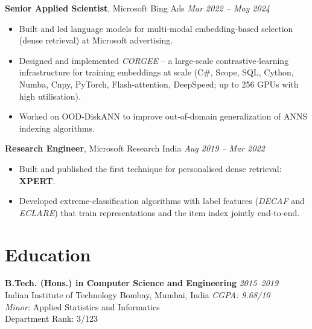 \documentclass[11pt,a4paper,sans]{moderncv}        %
\begin{document}
\textbf{Senior Applied Scientist}, Microsoft Bing Ads \hfill \textit{Mar 2022 -- May 2024}
\begin{itemize}
  \item Built and led language models for multi‑modal embedding‑based selection (dense retrieval) at Microsoft advertising.
  \item Designed and implemented \emph{CORGEE} -- a large‑scale contrastive‑learning infrastructure for training embeddings at scale (C\#, Scope, SQL, Cython, Numba, Cnpy, PyTorch, Flash‑attention, DeepSpeed; up to 256 GPUs with high utilisation).
  \item Worked on OOD‑DiskANN to improve out‑of‑domain generalization of ANNS indexing algorithms.
\end{itemize}
\vspace{5pt}

\textbf{Research Engineer}, Microsoft Research India \hfill \textit{Aug 2019 -- Mar 2022}
\begin{itemize}
  \item Built and published the first technique for personalised dense retrieval: \textbf{XPERT}.
  \item Developed extreme‑classification algorithms with label features (\emph{DECAF} and \emph{ECLARE}) that train representations and the item index jointly end‑to‑end.
\end{itemize}

\vspace{-5pt}
\section{Education}
\textbf{B.Tech. (Hons.) in Computer Science and Engineering} \hfill \textit{2015--2019}\\
Indian Institute of Technology Bombay, Mumbai, India \hfill \textit{CGPA: 9.68/10}\\
\textit{Minor:} Applied Statistics and Informatics\\
Department Rank: 3/123

\vspace{-5pt}
\end{document}
